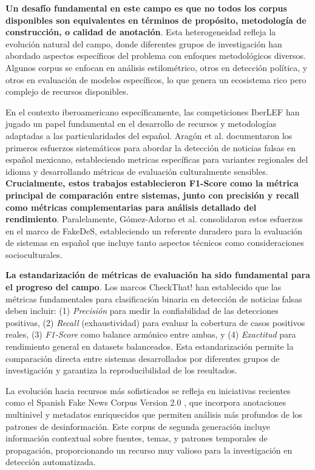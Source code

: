 \textbf{Un desafío fundamental en este campo es que no todos los corpus disponibles son equivalentes en términos de propósito, metodología de construcción, o calidad de anotación}. Esta heterogeneidad refleja la evolución natural del campo, donde diferentes grupos de investigación han abordado aspectos específicos del problema con enfoques metodológicos diversos. Algunos corpus se enfocan en análisis estilométrico, otros en detección política, y otros en evaluación de modelos específicos, lo que genera un ecosistema rico pero complejo de recursos disponibles.

En el contexto iberoamericano específicamente, las competiciones IberLEF han jugado un papel fundamental en el desarrollo de recursos y metodologías adaptadas a las particularidades del español. Aragón et al. \cite{aragon2020overview} documentaron los primeros esfuerzos sistemáticos para abordar la detección de noticias falsas en español mexicano, estableciendo metricas específicas para variantes regionales del idioma y desarrollando métricas de evaluación culturalmente sensibles. \textbf{Crucialmente, estos trabajos establecieron F1-Score como la métrica principal de comparación entre sistemas, junto con precisión y recall como métricas complementarias para análisis detallado del rendimiento}. Paralelamente, Gómez-Adorno et al. \cite{gomez2021overview} consolidaron estos esfuerzos en el marco de FakeDeS, estableciendo un referente duradero para la evaluación de sistemas en español que incluye tanto aspectos técnicos como consideraciones socioculturales.

\textbf{La estandarización de métricas de evaluación ha sido fundamental para el progreso del campo}. Los marcos CheckThat! \cite{barron2023clef} han establecido que las métricas fundamentales para clasificación binaria en detección de noticias falsas deben incluir: (1) \textit{Precisión} para medir la confiabilidad de las detecciones positivas, (2) \textit{Recall} (exhaustividad) para evaluar la cobertura de casos positivos reales, (3) \textit{F1-Score} como balance armónico entre ambas, y (4) \textit{Exactitud} para rendimiento general en datasets balanceados. Esta estandarización permite la comparación directa entre sistemas desarrollados por diferentes grupos de investigación y garantiza la reproducibilidad de los resultados.

La evolución hacia recursos más sofisticados se refleja en iniciativas recientes como el Spanish Fake News Corpus Version 2.0 \cite{ramirez2021spanish}, que incorpora anotaciones multinivel y metadatos enriquecidos que permiten análisis más profundos de los patrones de desinformación. Este corpus de segunda generación incluye información contextual sobre fuentes, temas, y patrones temporales de propagación, proporcionando un recurso muy valioso para la investigación en detección automatizada.


